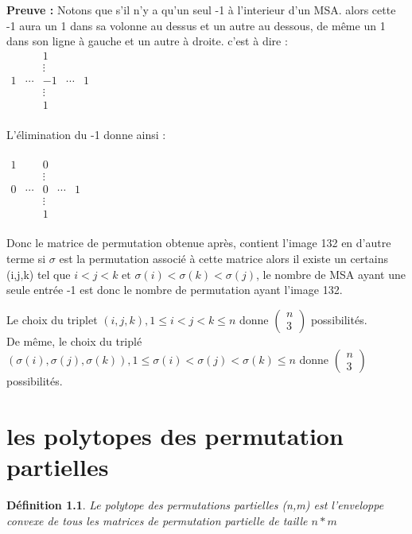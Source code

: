 \documentclass{book}
\newtheorem{petit_nom2}{Définition}[chapter]
\begin{document}
\textbf{Preuve :}
Notons que s'il n'y a qu'un seul -1 à l'interieur d'un MSA. alors cette -1 aura un 1 dans sa volonne au dessus et un autre au dessous, de même un 1 dans son ligne à gauche et un autre à droite. c'est à dire : \\
$\begin{matrix}
&&1&&\\&&\vdots&&\\1&\cdots&-1&\cdots&1\\&&\vdots&&\\&&1&&
\end{matrix} 
$\\\\
L'élimination du -1 donne ainsi :\\\\$\begin{matrix}
1&&0&&\\&&\vdots&&\\0&\cdots&0&\cdots&1\\&&\vdots&&\\&&1&&
\end{matrix} 
$\\\\
Donc le matrice de permutation obtenue après, contient l'image 132 en d'autre terme si $\sigma$ est la permutation associé à cette matrice alors il existe un certains (i,j,k) tel que $i<j<k \mbox{ et } \sigma(i)<\sigma(k)<\sigma(j)$, le nombre de MSA ayant une seule entrée -1 est donc le nombre de permutation ayant l'image 132.

Le choix du triplet $(i,j,k), 1 \leq i < j < k \leq n$ donne $\begin{pmatrix}
n\\3
\end{pmatrix}$ possibilités.\\
De même, le choix du triplé $ (\sigma(i),\sigma(j),\sigma(k)), 1 \leq \sigma(i) < \sigma(j) < \sigma(k) \leq n $ donne $\begin{pmatrix}
n\\3
\end{pmatrix}$ possibilités.


  \chapter{les polytopes des permutation partielles}
\begin{petit_nom2} 
  Le polytope des permutations partielles (n,m) est l'enveloppe convexe de tous les matrices de permutation partielle de taille $n*m$ 
 \end{petit_nom2}
\end{document}
